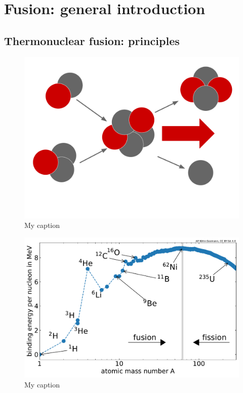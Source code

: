 \setchapterpreamble[u]{\margintoc}
\chapter{Fusion: general introduction} %
\label{Chapter1} %
\section{Thermonuclear fusion: principles}
\lipsum[6]
\lipsum[6]

\begin{figure} [h]
    \centering
    \includegraphics[width=\linewidth]{Figures/Chapter1/nuc_fus.pdf}
    \caption{My caption}
\end{figure}

\lipsum[6]
\lipsum[6]

\begin{figure} [h]
    \centering
    \includegraphics[width=\linewidth]{Figures/Chapter1/binding_energy_per_nucleon.pdf}
    \caption{My caption}
\end{figure}

